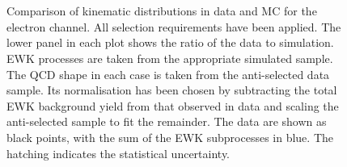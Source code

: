 \begin{figure}
\centering
{}
\\
\\
\caption[Kinematic distributions in data and \acs{MC} for the electron
channel]{Comparison of kinematic distributions in data and \acs{MC} for the
  electron channel. All selection requirements have been applied. The lower
  panel in each plot shows the ratio of the data to simulation. \ac{EWK}
  processes are taken from the appropriate simulated sample. The \ac{QCD}
  shape in each case is taken from the anti-selected data sample. Its
  normalisation has been chosen by subtracting the total \ac{EWK} background
  yield from that observed in data and scaling the anti-selected sample to fit
  the remainder. The data are shown as black points, with the sum of the
  \ac{EWK} subprocesses in blue. The hatching indicates the statistical
  uncertainty.}
\label{fig:wpol_datamc_ele}
\end{figure}

